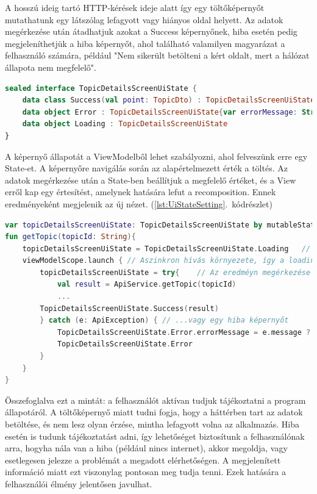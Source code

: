 A hosszú ideig tartó HTTP-kérések ideje alatt így egy töltőképernyőt mutathatunk egy látszólag lefagyott vagy hiányos oldal helyett.  
Az adatok megérkezése után átadhatjuk azokat a Success képernyőnek, hiba esetén pedig megjeleníthetjük a hiba képernyőt, ahol található valamilyen magyarázat a felhasználó számára, például "Nem sikerült betölteni a kért oldalt, mert a hálózat állapota nem megfelelő".  

\begin{lstlisting}[caption={UiState megvalóstása}, label={lst:UiState}, language=Kotlin]
sealed interface TopicDetailsScreenUiState {
    data class Success(val point: TopicDto) : TopicDetailsScreenUiState
    data object Error : TopicDetailsScreenUiState{var errorMessage: String = ""}
    data object Loading : TopicDetailsScreenUiState
}
\end{lstlisting}



A képernyő állapotát a ViewModelből lehet szabályozni, ahol felveszünk erre egy State-et. A képernyőre navigálás során az alapértelmezett érték a töltés.  
Az adatok megérkezése után a State-ben beállítjuk a megfelelő értéket, és a View erről kap egy értesítést, amelynek hatására lefut a recomposition. Ennek eredményeként megjelenik az új nézet.  
(\ref{lst:UiStateSetting}.~kódrészlet) 

\begin{lstlisting}[caption={UiState beállítása}, label={lst:UiStateSetting}, language=Kotlin, float]
var topicDetailsScreenUiState: TopicDetailsScreenUiState by mutableStateOf(TopicDetailsScreenUiState.Loading) // State alap loading értékkel
fun getTopic(topicId: String){
    topicDetailsScreenUiState = TopicDetailsScreenUiState.Loading   // Ha nem lenne beállítva beállítjuk a loadingot
    viewModelScope.launch { // Aszinkron hívás környezete, így a loading animációt nemblokkoljuk
        topicDetailsScreenUiState = try{    // Az eredméyn megérkezése után vagy mutatjuk az adatot...
            val result = ApiService.getTopic(topicId)
            ...
        TopicDetailsScreenUiState.Success(result)
        } catch (e: ApiException) { // ...vagy egy hiba képernyőt
            TopicDetailsScreenUiState.Error.errorMessage = e.message ?: "Unkown error"
            TopicDetailsScreenUiState.Error
        } 
    }
}
\end{lstlisting}

Összefoglalva ezt a mintát: a felhasználót aktívan tudjuk tájékoztatni a program állapotáról.  
A töltőképernyő miatt tudni fogja, hogy a háttérben tart az adatok betöltése, és nem lesz olyan érzése, mintha lefagyott volna az alkalmazás.  
Hiba esetén is tudunk tájékoztatást adni, így lehetőséget biztosítunk a felhasználónak arra, hogyha nála van a hiba (például nincs internet), akkor megoldja, vagy esetlegesen jelezze a problémát a megadott elérhetőségen. A megjelenített információ miatt ezt viszonylag pontosan meg tudja tenni.  
Ezek hatására a felhasználói élmény jelentősen javulhat.

